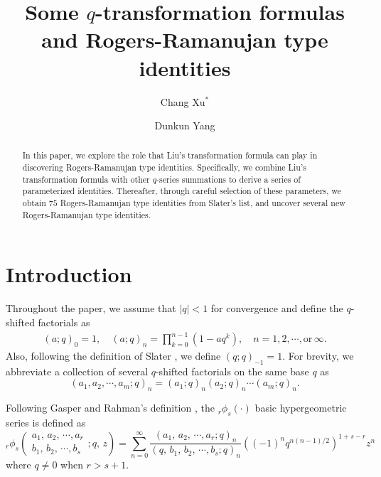 \documentclass[reqno,12pt]{amsart}
\author{Chang Xu$^*$}
\author{Dunkun Yang}
\title{Some $q$-transformation formulas and Rogers-Ramanujan type identities}
\theoremstyle{remark}
\numberwithin{equation}{section}
\begin{document}
\maketitle
\begin{abstract}
In this paper, we explore the role that Liu's transformation formula can play in discovering Rogers-Ramanujan type identities.  
Specifically, we combine Liu's transformation formula with other $q$-series summations to derive a series of parameterized identities.
Thereafter, through careful selection of these  parameters,  we obtain  $75$ Rogers-Ramanujan type identities from Slater's list, and uncover several new Rogers-Ramanujan type identities.%
% 
%
\end{abstract}
%
\section{Introduction}
Throughout the paper, we assume that $|q|<1$ for convergence and define the $q$-shifted factorials as
\begin{align*}
\left(a;q\right)_{0}=1,
\quad\left(a;q\right)_{n}=\prod_{k=0}^{n-1}\left(1-aq^k\right)
,\quad
n=1,2,\cdots, \mathrm{or}\, {\infty}.\end{align*}
Also,  following the definition of Slater \cite{Slater}, we define
$\left(q;q\right)_{-1}=1$.
For brevity, we abbreviate a collection of several  $q$-shifted factorials on the same base $q$ as
\begin{equation*}
\left(a_1,a_2,\cdots,a_m;q\right)_n
=\left(a_1;q\right)_{n}\left(a_2;q\right)_{n}\cdots\left(a_m;q\right)_{n}.
\end{equation*} 

Following Gasper and Rahman's definition \cite{Gasper_and_Rahman}, the $_r\phi_s(\cdot)$ basic hypergeometric series is defined as
\begin{equation*}
{_r\phi_s}\left(
\begin{array}{cccc}
a_1,\,a_2,\,\cdots,a_r\\
b_1,\,b_2,\,\cdots,b_s
\end{array}
;q,\,z
\right)
=
\sum_{n=0}^{\infty}
\frac{\left(a_1,\,a_2,\,\cdots,a_r;q\right)_n}
{\left(q,\,b_1,\,b_2,\,\cdots,b_s;q\right)_n}
\left(\left(-1\right)^nq^{n(n-1)/2}\right)^{1+s-r}z^n
\end{equation*}
where $q\neq0$ when $r>s+1$.
\end{document}
